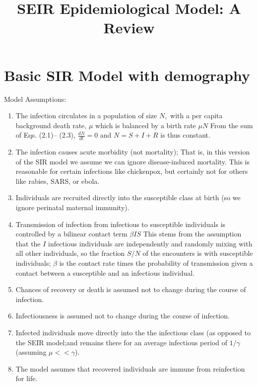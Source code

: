 \documentclass[12pt]{article}\usepackage[]{graphicx}\usepackage[]{color}
\title{SEIR Epidemiological Model: A Review}
\author{}
\date{
}
\begin{document}
\maketitle

\section{Basic SIR Model with demography}

Model Assumptions:

\begin{enumerate}
\item The infection circulates in a population of size $N,$ with a per capita background death rate, $\mu$ which is balanced by a birth rate $\mu N$ From the sum of Eqs. (2.1)– (2.3), $\frac{dN}{dt} = 0$ and $N = S + I + R$ is thus constant.
\item The infection causes acute morbidity (not mortality); That is, in this version of the SIR model we assume we can ignore disease-induced mortality. This is reasonable for certain infections like chickenpox, but certainly not for others like rabies, SARS, or ebola.
\item Individuals are recruited directly into the susceptible class at birth (so we ignore perinatal maternal immunity).
\item Transmission of infection from infectious to susceptible individuals is controlled by a bilinear contact term $\beta I S$ This stems from the assumption that the $I$ infectious individuals are independently and randomly mixing with all other individuals, so the fraction $S/N$ of the encounters is with susceptible individuals; $\beta$ is the contact rate times the probability of transmission given a contact between a susceptible and an infectious individual.
\item Chances of recovery or death is assumed not to change during the course of infection.
\item Infectiousness is assumed not to change during the course of infection.
\item Infected individuals move directly into the the infectious class (as opposed to the SEIR model;and remains there for an average infectious period of $1/\gamma$ (assuming $\mu << \gamma$).
\item The model assumes that recovered individuals are immune from reinfection for
life.
\end{enumerate}
\end{document}
